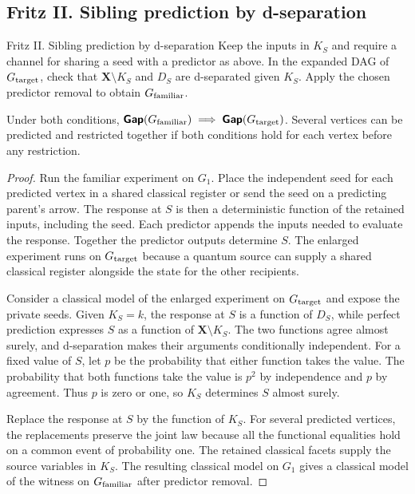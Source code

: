 \subsection{Fritz II. Sibling prediction by d-separation}\label{sec:dsep}
\begin{piggyback}{Fritz II. Sibling prediction by d-separation}
Keep the inputs in \(K_S\) and require a channel for sharing a seed with
a predictor as above. In the expanded DAG of \(G_{\text{target}}\), check that
\(\mathbf X\setminus K_S\) and \(D_S\) are d-separated given \(K_S\).
Apply the chosen predictor removal to obtain \(G_{\text{familiar}}\).
\end{piggyback}
\begin{proposition}\label{prop:dsep}
Under both conditions, \(\operatorname{\text{\normalfont\sffamily\bfseries Gap}}(G_{\text{familiar}})\implies\operatorname{\text{\normalfont\sffamily\bfseries Gap}}(G_{\text{target}})\).
Several vertices can be predicted and restricted together if both
conditions hold for each vertex before any restriction.
\end{proposition}
\begin{proof}
Run the familiar experiment on \(G_1\). Place the independent seed for
each predicted vertex in a shared classical register or send the seed
on a predicting parent's arrow. The response at \(S\) is then a
deterministic function of the retained inputs, including the seed. Each
predictor appends the inputs needed to evaluate the response. Together
the predictor outputs determine \(S\). The enlarged experiment runs on
\(G_{\text{target}}\) because a quantum source can supply a shared classical
register alongside the state for the other recipients.

Consider a classical model of the enlarged experiment on \(G_{\text{target}}\)
and expose the private seeds. Given \(K_S=k\), the response at \(S\)
is a function of \(D_S\), while perfect prediction expresses \(S\) as
a function of \(\mathbf X\setminus K_S\). The two functions agree
almost surely, and d-separation makes their arguments conditionally
independent. For a fixed value of \(S\), let \(p\) be the probability
that either function takes the value. The probability that both functions take
the value is \(p^2\) by independence and \(p\) by agreement. Thus
\(p\) is zero or one, so \(K_S\) determines \(S\) almost surely.

Replace the response at \(S\) by the function of \(K_S\). For several
predicted vertices, the replacements preserve the joint law because all
the functional equalities hold on a common event of probability one.
The retained classical facets supply the source variables in \(K_S\).
The resulting classical model on \(G_1\) gives a classical model of
the witness on \(G_{\text{familiar}}\) after predictor removal.
\end{proof}

